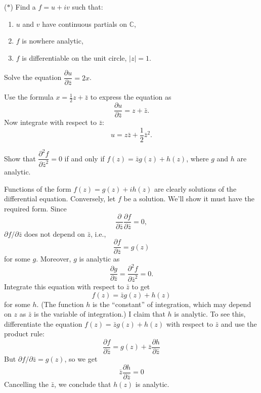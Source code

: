 \documentclass[12pt, answers]{exam}
\newcommand{\CC}{\mathbb{C}}
\begin{document}
\begin{questions}
    \question ($*$) Find a $f=u + iv$ such that:
    \begin{enumerate}
        \item $u$ and $v$ have continuous partials on $\CC$,
        \item $f$ is nowhere analytic,
        \item $f$ is differentiable on the unit circle, $|z|=1$.
    \end{enumerate}

    \question
    Solve the equation $\dfrac{\partial u}{\partial \bar z} = 2x$.

    \begin{solution}
        Use the formula $x=\frac12{z + \bar z}$ to express the equation as
        \[
            \dfrac{\partial u}{\partial \bar z} = z + \bar z.
        \]
        Now integrate with respect to $\bar z$:
        \[
            u = z\bar z + \frac12{\bar z}^2.
        \]
    \end{solution}

    \question
    Show that $\dfrac{\partial^2 f}{\partial {\bar z}^2} = 0$
    if and only if $f(z)=\bar zg(z) + h(z)$, where $g$ and $h$ are analytic.

    \begin{solution}
        Functions of the form $f(z) = g(z) + ih(z)$ are clearly solutions of the differential equation.
        Conversely, let $f$ be a solution. We'll show it must have the required form. Since
        \[
            \dfrac{\partial}{\partial \bar z}\dfrac{\partial f}{\partial \bar z} = 0,
        \]
        $\partial f/\partial \bar z$ does not depend on $\bar z$, i.e.,
        $$\frac{\partial f}{\partial \bar z} = g(z)$$ for some $g$.
        Moreover, $g$ is analytic as
        \[
            \frac{\partial g}{\partial \bar z} = \dfrac{\partial^2 f}{\partial {\bar z}^2} = 0.
        \]
        Integrate this equation with respect to $\bar z$ to get
        \[
            f(z) = \bar z g(z) + h(z)
        \]
        for some $h$. (The function $h$ is the ``constant'' of integration, which may depend on $z$ as $\bar z$ is the variable of integration.)
        I claim that $h$ is analytic.
        To see this, differentiate the equation $f(z)=\bar z g(z) + h(z)$ with respect to $\bar z$
        and use the product rule:
        \[
            \frac{\partial f}{\partial \bar z} = g(z) + \bar z\frac{\partial h}{\partial \bar z}
        \]
        But $\partial f/\partial \bar z=g(z)$, so we get
        \[
            \bar z\frac{\partial h}{\partial \bar z} = 0
        \]
        Cancelling the $\bar z$, we conclude that $h(z)$ is analytic.


\end{solution}
\end{questions}
\end{document}
